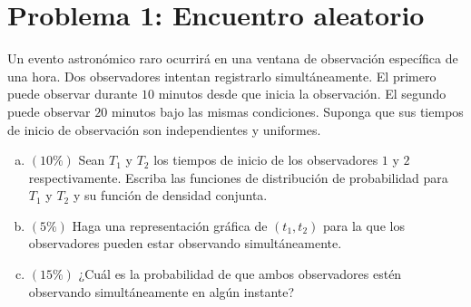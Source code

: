 \documentclass[a4paper]{article}
\begin{document}
\section{Problema 1: Encuentro aleatorio}
Un evento astronómico raro ocurrirá en una ventana de observación específica de una hora. Dos observadores intentan registrarlo simultáneamente. El primero puede observar durante $10$ minutos desde que inicia la observación. El segundo puede observar $20$ minutos bajo las mismas condiciones. Suponga que sus tiempos de inicio de observación son independientes y uniformes.
\begin{enumerate}[a.]
	\item $(10\%)$ Sean  $T_1$ y $T_2$ los tiempos de inicio de los observadores $1$ y $2$ respectivamente. Escriba las funciones de distribución de probabilidad para $T_1$ y $T_2$ y su función de densidad conjunta.
	\item $(5\%)$ Haga una representación gráfica de $(t_1,t_2)$ para la que los observadores pueden estar observando simultáneamente.
	\item $(15\%)$ ¿Cuál es la probabilidad de que ambos observadores estén observando simultáneamente en algún instante?
\end{enumerate}
\end{document}
